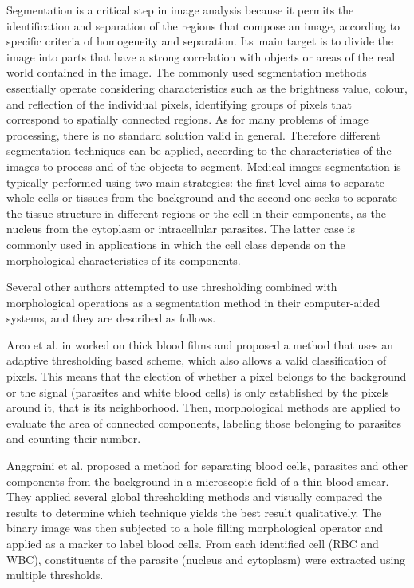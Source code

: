 Segmentation is a critical step in image analysis because it permits the identification and separation of the regions that compose an image, according to specific criteria of homogeneity and separation. Its~main target is to divide the image into parts that have a strong correlation with objects or areas of the real world contained in the image.
The commonly used segmentation methods essentially operate considering characteristics such as the brightness value, colour, and reflection of the individual pixels, identifying groups of pixels that correspond to spatially connected regions. As for many problems of image processing, there is no standard solution valid in general. Therefore different segmentation techniques can be applied, according to the characteristics of the images to process and of the objects to segment.
Medical images segmentation is typically performed using two main strategies: the first level aims to separate whole cells or tissues from the background and the second one seeks to separate the tissue structure in different regions or the cell in their components, as the nucleus from the cytoplasm or intracellular parasites. The latter case is commonly used in applications in which the cell class depends on the morphological characteristics of its components.

Several other authors attempted to use thresholding combined with morphological operations as a segmentation method in their computer-aided systems, and they are described as follows.

Arco et al. in \cite{Arco2014} worked on thick blood films and proposed a method that uses an adaptive thresholding based scheme, which also allows a valid classification of pixels. This means that the election of whether a pixel belongs to the background or the signal (parasites and white blood cells) is only established by the pixels around it, that is its neighborhood. Then, morphological methods are applied to evaluate the area of connected components, labeling those belonging to parasites and counting their number.

Anggraini et al. \cite{Anggraini2011} proposed a method for separating blood cells, parasites and other components from the background in a microscopic field of a thin blood smear. They applied several global thresholding methods and visually compared the results to determine which technique yields the best result qualitatively. The binary image was then subjected to a hole filling morphological operator and applied as a marker to label blood cells. From each identified cell (RBC and WBC), constituents of the parasite (nucleus and cytoplasm) were extracted using multiple thresholds.

